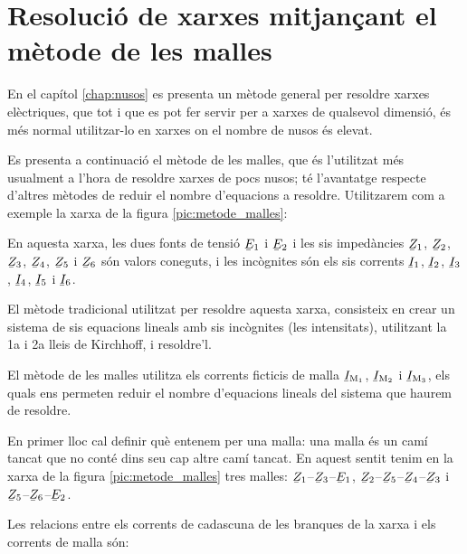 \section{Resolució de xarxes mitjançant el mètode de les malles}\label{sec:metode-malles}

En el capítol \ref{chap:nusos} es presenta un mètode general per resoldre xarxes elèctriques, que tot i que es pot fer servir per a xarxes de qualsevol dimensió, és més normal utilitzar-lo en xarxes on el nombre de nusos és elevat.

Es presenta a continuació el mètode de les malles, que és l'utilitzat més usualment a l'hora de resoldre xarxes de pocs nusos; té l'avantatge respecte d'altres mètodes de reduir el nombre d'equacions a resoldre. Utilitzarem com a exemple la xarxa de la figura \vref{pic:metode_malles}:

\begin{center}
    
     \label{pic:metode_malles}
\end{center}

En aquesta xarxa, les dues fonts de tensió $\cmplx{E}_1$ i $\cmplx{E}_2$ i les sis impedàncies $\cmplx{Z}_1$, $\cmplx{Z}_2$, $\cmplx{Z}_3$, $\cmplx{Z}_4$, $\cmplx{Z}_5$ i $\cmplx{Z}_6$  són valors coneguts, i les incògnites són els sis corrents $\cmplx{I}_1$, $\cmplx{I}_2$, $\cmplx{I}_3$, $\cmplx{I}_4$, $\cmplx{I}_5$ i $\cmplx{I}_6$.

El mètode tradicional utilitzat per  resoldre aquesta xarxa, consisteix en crear un sistema  de sis equacions lineals amb sis incògnites (les intensitats), utilitzant  la 1a i 2a lleis de Kirchhoff, i resoldre'l.

El mètode de les malles utilitza els corrents ficticis de malla $\cmplx{I}\ped{M_1}$, $\cmplx{I}\ped{M_2}$ i $\cmplx{I}\ped{M_3}$, els quals ens permeten reduir el nombre d'equacions lineals del  sistema que haurem de resoldre.



En primer lloc cal definir què entenem per una malla: una malla és un camí tancat que no conté dins seu cap altre camí tancat. En aquest sentit tenim en la xarxa de la figura \vref{pic:metode_malles} tres malles: $\cmplx{Z}_1$--$\cmplx{Z}_3$--$\cmplx{E}_1$, $\cmplx{Z}_2$--$\cmplx{Z}_5$--$\cmplx{Z}_4$--$\cmplx{Z}_3$ i $\cmplx{Z}_5$--$\cmplx{Z}_6$--$\cmplx{E}_2$.

Les relacions entre els corrents de cadascuna de les branques de la xarxa i els corrents de malla són:

